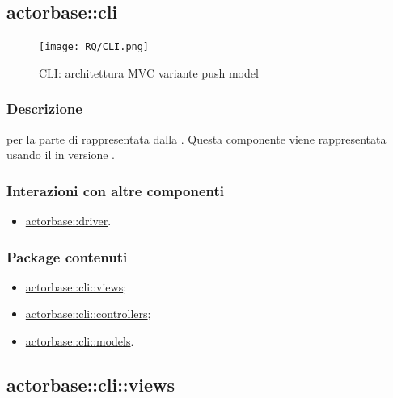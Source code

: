 \documentclass{scalatekids-article}
\begin{document}

\subsection{actorbase::cli}
\label{sec:actorbase::cli}

\begin{figure}[H]
  \begin{center}
    \texttt{[image: RQ/CLI.png]}
    \caption{CLI: architettura MVC variante push model}
  \end{center}
\end{figure}

\subsubsection{Descrizione}
 per la parte di  rappresentata dalla .
Questa componente viene rappresentata usando il 
 in versione .

\subsubsection{Interazioni con altre componenti}
\begin{itemize}
\item \hyperref[sec:actorbase::driver]{actorbase::driver}.
\end{itemize}

\subsubsection{Package contenuti}
\begin{itemize}
\item \hyperref[sec:actorbase::cli::views]{actorbase::cli::views};
\item \hyperref[sec:actorbase::cli::controllers]{actorbase::cli::controllers};
\item \hyperref[sec:actorbase::cli::models]{actorbase::cli::models}.
\end{itemize}

\subsection{actorbase::cli::views}
\label{sec:actorbase::cli::views}
\end{document}
